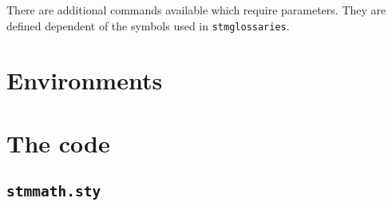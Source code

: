 \documentclass[%
  type=article,%
  layout=koma,%
  date=true,%
  hyperref=true,%
  listings=true,%
  math=true,%
]{stmtext}
\begin{document}
There are additional commands available which require parameters. They are defined dependent of the symbols used in \texttt{stmglossaries}.

\section{Environments}

\newpage

\appendix

\newpage
\section{The code}

\subsection{\protect\texttt{stmmath.sty}}


\end{document}
